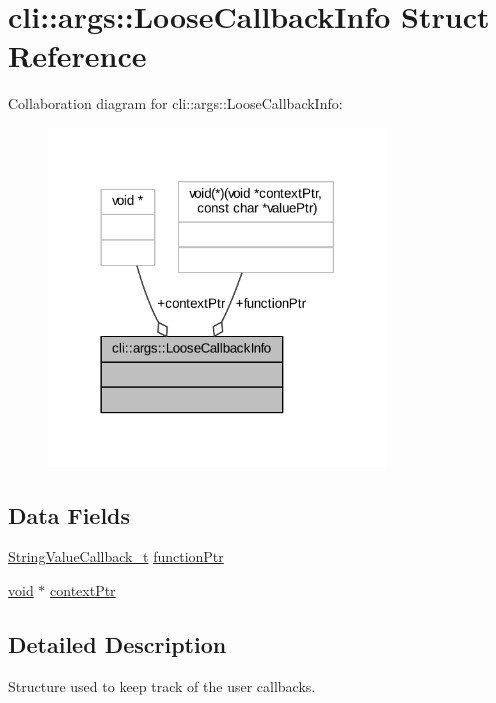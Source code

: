 \hypertarget{structcli_1_1args_1_1_loose_callback_info}{}\section{cli\+:\+:args\+:\+:Loose\+Callback\+Info Struct Reference}
\label{structcli_1_1args_1_1_loose_callback_info}


Collaboration diagram for cli\+:\+:args\+:\+:Loose\+Callback\+Info\+:
\nopagebreak
\begin{figure}[H]
\begin{center}
\leavevmode
\includegraphics[width=254pt]{structcli_1_1args_1_1_loose_callback_info__coll__graph}
\end{center}
\end{figure}
\subsection*{Data Fields}
\begin{DoxyCompactItemize}
\item 
\hyperlink{namespacecli_1_1args_aa08565ab872ff119b0a21d4bbe1d8e4e}{String\+Value\+Callback\+\_\+t} \hyperlink{structcli_1_1args_1_1_loose_callback_info_a1d7138169e42d4a4f0ad58fe9c3141bc}{function\+Ptr}
\item 
\hyperlink{_t_e_m_p_l_a_t_e__cdef_8h_ac9c84fa68bbad002983e35ce3663c686}{void} $\ast$ \hyperlink{structcli_1_1args_1_1_loose_callback_info_ad5e86ec62a360b6e213f46b8bc5b96c2}{context\+Ptr}
\end{DoxyCompactItemize}


\subsection{Detailed Description}
Structure used to keep track of the user callbacks. 

